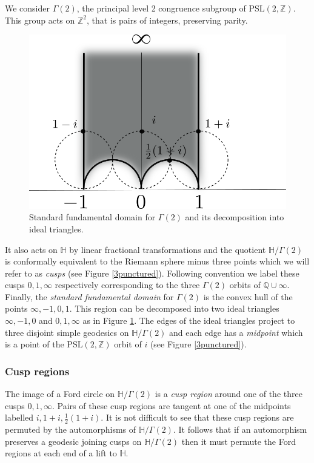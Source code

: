 \documentclass[12pt]{amsart}
\theoremstyle{plain}
\theoremstyle{definition}
\def\HH{\mathbb{H}}
\def\xx{\HH/g2}
\def\ZZ{\mathbb{Z}}
\def\QQ{\mathbb{Q}}
\def\sl2{\mathrm{PSL}(2, \ZZ)}
\def\g2{\Gamma(2)}
\def\xx{\HH/\g2}
\begin{document}
We consider $\g2$,
the principal level 2 congruence subgroup of $\sl2$.
This group acts on $\ZZ^2$, that is pairs of integers,  preserving parity.

 \begin{figure}[hb]
\begin{center}
\includegraphics[scale=.5]{fund_dom.png} 
\end{center}
\caption{Standard fundamental domain for $\g2$ and its decomposition into ideal triangles.}
\label{fund}
\end{figure}


It also acts on $\HH$ by linear fractional transformations
and the  quotient $\xx$ is conformally equivalent to the Riemann  sphere minus three points
which we will refer to as \textit{cusps}
(see Figure \ref{3punctured}). 
Following  convention we label these cusps $0,1,\infty$ respectively
corresponding to the three $\g2$ orbits of $\QQ \cup \infty$. 
Finally, the \textit{standard fundamental domain}  for $\g2$ 
is the convex hull of the points $\infty, -1, 0 , 1$.
This region can be decomposed into two ideal triangles 
$\infty, -1, 0 $ and $ 0 , 1,\infty$ as in Figure \ref{fund}.
The edges of the ideal triangles project to three disjoint simple geodesics on $\xx$
and each edge has a \textit{midpoint} 
which is a point of the $\sl2$ orbit of $i$ (see Figure \ref{3punctured}).



\subsubsection{Cusp regions}

The image of a Ford circle on $\xx$ is a \textit{cusp region}
around one of the three cusps $0,1,\infty$.
Pairs of these cusp regions are tangent at one of the midpoints
labelled $i, 1+i, \frac12(1+i)$.
It is not difficult to see that these cusp regions 
are permuted by the automorphisms of $\xx$.
It follows that if an automorphism preserves a geodesic  joining cusps on $\xx$
then it must permute the Ford regions at each end of a lift to $\HH$.
\end{document}
